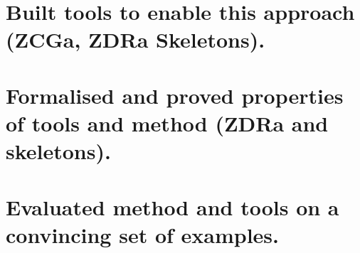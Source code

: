 \section{Built tools to enable this approach (ZCGa, ZDRa Skeletons).}

\section{Formalised and proved properties of tools and method (ZDRa and skeletons).}

\section{Evaluated method and tools on a convincing set of examples.}





